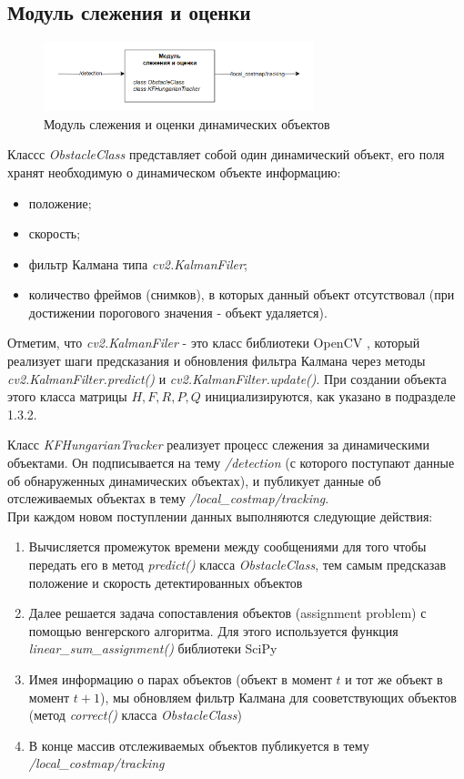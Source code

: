 \subsection{Модуль слежения и оценки}

\begin{figure}[h]
    \centering
    \includegraphics[width=0.7\textwidth]{images/chap_3/tracking_est.png}
    \caption{Модуль слежения и оценки динамических объектов}
    \label{fig:tracking_est}
\end{figure}

Классс \textit{ObstacleClass} представляет собой один динамический объект, его поля хранят необходимую о динамическом объекте информацию:
\begin{itemize}
    \item положение;
    \item скорость;
    \item фильтр Калмана типа \textit{cv2.KalmanFiler};
    \item количество фреймов (снимков), в которых данный объект отсутствовал (при достижении порогового значения - объект удаляется).
\end{itemize}

Отметим, что \textit{cv2.KalmanFiler} - это класс библиотеки OpenCV \cite{kalman-filter-opencv}, который реализует шаги предсказания и обновления фильтра Калмана через методы \textit{cv2.KalmanFilter.predict()} и \textit{cv2.KalmanFilter.update()}. При создании объекта этого класса матрицы $H, F, R, P, Q$ инициализируются, как указано в подразделе 1.3.2.

Класс \textit{KFHungarianTracker} реализует процесс слежения за динамическими объектами. Он подписывается на тему \textit{/detection} (с которого поступают данные об обнаруженных динамических объектах), и публикует данные об отслеживаемых объектах в тему \textit{/local\_costmap/tracking}. \\
При каждом новом поступлении данных выполняются следующие действия:
\begin{enumerate}
    \item Вычисляется промежуток времени между сообщениями для того чтобы передать его в метод \textit{predict()} класса \textit{ObstacleClass}, тем самым предсказав положение и скорость детектированных объектов
    \item Далее решается задача сопоставления объектов (assignment problem) с помощью венгерского алгоритма. Для этого используется функция \textit{linear\_sum\_assignment()} библиотеки SciPy \cite{lin-sum-ass-scipy}
    \item Имея информацию о парах объектов (объект в момент $t$ и тот же объект в момент $t+1$), мы обновляем фильтр Калмана для сооветствующих объектов (метод \textit{correct()} класса \textit{ObstacleClass})
    \item В конце массив отслеживаемых объектов публикуется в тему \textit{/local\_costmap/tracking}
\end{enumerate}

